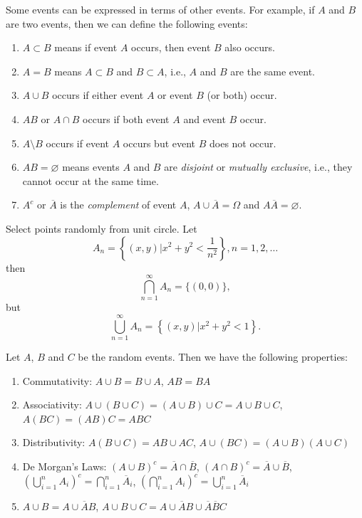 Some events can be expressed in terms of other events. For example, if \(A\) and \(B\) are two events, then we can define the following events:
\begin{enumerate}
  \item \(A \subset B\) means if event \(A\) occurs, then event \(B\) also occurs.
  \item \(A = B\) means \(A \subset B\) and \(B \subset A\), i.e., \(A\) and \(B\) are the same event.
  \item \(A \cup B\) occurs if either event \(A\) or event \(B\) (or both) occur.
  \item \(A B\) or \(A \cap B\) occurs if both event \(A\) and event \(B\) occur.
  \item \(A \setminus B\) occurs if event \(A\) occurs but event \(B\) does not occur.
  \item \(A B = \varnothing\) means events \(A\) and \(B\) are \emph{disjoint} or \emph{mutually exclusive}, i.e., they cannot occur at the same time.
  \item \(A^c\) or \(\overline{A}\) is the \emph{complement} of event \(A\), \(A \cup \overline{A} = \Omega\) and \(A \overline{A} = \varnothing\).
\end{enumerate}

\begin{example}
  Select points randomly from unit circle. Let
  \[
  A_n = \left\{(x,y) \vert x^2 + y^2 < \frac{1}{n^2}\right\}, n = 1, 2, \dots
  \]
  then
  \[
    \bigcap_{n=1}^\infty A_n = \{(0, 0)\},
  \]
  but
  \[
    \bigcup_{n=1}^\infty A_n = \left\{(x,y) \vert x^2 + y^2 < 1\right\}.
  \]
\end{example}

\begin{proposition}
  Let \(A\), \(B\) and \(C\) be the random events. Then we have the following properties:
  \begin{enumerate}
    \item Commutativity: \(A \cup B = B \cup A\), \(A B = B A\)
    \item Associativity: \(A \cup (B \cup C) = (A \cup B) \cup C = A \cup B \cup C\), \(A (B C) = (A B) C = A B C\)
    \item Distributivity: \(A (B \cup C) = A B \cup A C\), \(A \cup (B C) = (A \cup B)(A \cup C)\)
    \item De Morgan's Laws: \((A \cup B)^c = \overline{A} \cap \overline{B}\), \((A \cap B)^c = \overline{A} \cup \overline{B}\), \(\left(\bigcup_{i=1}^n A_i\right)^c = \bigcap_{i=1}^n \overline{A}_i\), \(\left(\bigcap_{i=1}^n A_i\right)^c = \bigcup_{i=1}^n \overline{A}_i\)
    \item \(A \cup B = A \cup \overline{A} B\), \(A \cup B \cup C = A \cup \overline{A} B \cup \overline{A} \overline{B} C\)
  \end{enumerate}
\end{proposition}

